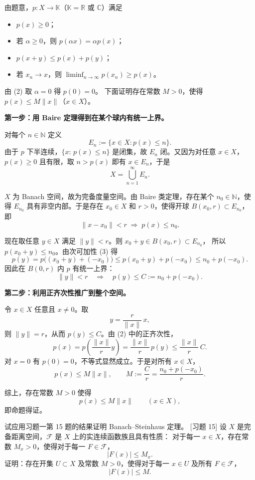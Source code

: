 \begin{solution}
由题意，$p:X\to\mathbb K$（$\mathbb K=\mathbb R$ 或 $\mathbb C$）满足  

\begin{itemize}
  \item[(1)] $p(x)\ge0$；
  \item[(2)] 若 $\alpha\ge0$，则 $p(\alpha x)=\alpha p(x)$；
  \item[(3)] $p(x+y)\le p(x)+p(y)$；
  \item[(4)] 若 $x_n\to x$，则 $\displaystyle\liminf_{n\to\infty}p(x_n)\ge p(x)$。
\end{itemize}

由 (2) 取 $\alpha=0$ 得 $p(0)=0$。  
下面证明存在常数 $M>0$，使得 $p(x)\le M\|x\|$（$x\in X$）。

\medskip\noindent
\textbf{第一步：用 Baire 定理得到在某个球内有统一上界。}

对每个 $n\in\mathbb N$ 定义
\[
E_n:=\{x\in X: p(x)\le n\}.
\]
由于 $p$ 下半连续，$\{x:\,p(x)\le n\}$ 是闭集，故 $E_n$ 闭。又因为对任意
$x\in X$，$p(x)\ge0$ 且有限，取 $n>p(x)$ 即有 $x\in E_n$，于是
\[
X=\bigcup_{n=1}^\infty E_n.
\]

$X$ 为 Banach 空间，故为完备度量空间。由 Baire 类定理，存在某个
$n_0\in\mathbb N$，使得 $E_{n_0}$ 具有非空内部。于是存在 $x_0\in X$ 和
$r>0$，使得开球 $B(x_0,r)\subset E_{n_0}$，即
\[
\|x-x_0\|<r \;\Rightarrow\; p(x)\le n_0.
\]

现在取任意 $y\in X$ 满足 $\|y\|<r$。则 $x_0+y\in B(x_0,r)\subset E_{n_0}$，
所以 $p(x_0+y)\le n_0$。由次可加性 (3) 得
\[
p(y)=p\bigl((x_0+y)+(-x_0)\bigr)\le p(x_0+y)+p(-x_0)\le n_0+p(-x_0).
\]
因此在 $B(0,r)$ 内 $p$ 有统一上界：
\[
\|y\|<r\quad\Rightarrow\quad p(y)\le C:=n_0+p(-x_0).
\]

\medskip\noindent
\textbf{第二步：利用正齐次性推广到整个空间。}

令 $x\in X$ 任意且 $x\neq0$。取
\[
y=\frac{r}{\|x\|}\,x,
\]
则 $\|y\|=r$，从而 $p(y)\le C$。由 (2) 中的正齐次性，
\[
p(x)=p\!\left(\frac{\|x\|}{r}y\right)=\frac{\|x\|}{r}\,p(y)
\le \frac{\|x\|}{r}\,C.
\]
对 $x=0$ 有 $p(0)=0$，不等式显然成立。于是对所有 $x\in X$，
\[
p(x)\le M\|x\|,\qquad M:=\frac{C}{r}=\frac{n_0+p(-x_0)}{r}.
\]

\medskip

综上，存在常数 $M>0$ 使得
\[
p(x)\le M\|x\|\qquad (x\in X),
\]
即命题得证。
\end{solution}

\begin{homework}[题目 9]

试应用习题一第 15 题的结果证明 Banach–Steinhaus 定理。
[习题 15]
设 $X$ 是完备距离空间，$\mathcal{F}$ 是 $X$ 上的实连续函数族且具有性质：
对于每一 $x\in X$，存在常数 $M_x>0$，使得对于每一 $F\in\mathcal{F}$，
\[
|F(x)|\le M_x.
\]
证明：存在开集 $U\subset X$ 及常数 $M>0$，使得对于每一 $x\in U$ 及所有
$F\in\mathcal{F}$，
\[
|F(x)|\le M.
\]
\end{homework}

